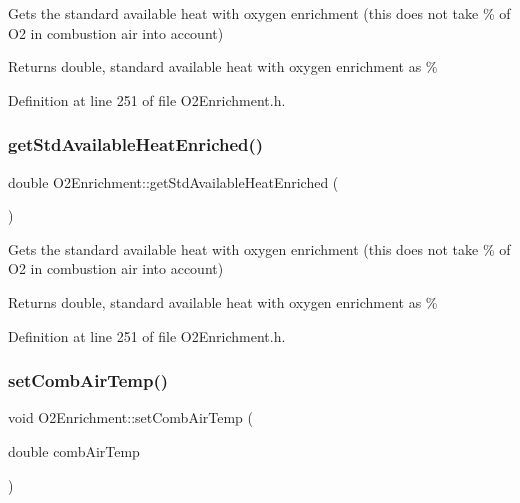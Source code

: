 Gets the standard available heat with oxygen enrichment (this does not take \% of O2 in combustion air into account) \begin{DoxyReturn}{Returns}
double, standard available heat with oxygen enrichment as \% 
\end{DoxyReturn}


Definition at line 251 of file O2\+Enrichment.\+h.

\mbox{\label{class_o2_enrichment_a24fd19f2aca20c7ba83061b832323ad6}} 
\subsubsection{\texorpdfstring{get\+Std\+Available\+Heat\+Enriched()}{getStdAvailableHeatEnriched()}\hspace{0.1cm}{\footnotesize\ttfamily [3/3]}}
{\footnotesize\ttfamily double O2\+Enrichment\+::get\+Std\+Available\+Heat\+Enriched (\begin{DoxyParamCaption}{ }\end{DoxyParamCaption})\hspace{0.3cm}{\ttfamily [inline]}}

Gets the standard available heat with oxygen enrichment (this does not take \% of O2 in combustion air into account) \begin{DoxyReturn}{Returns}
double, standard available heat with oxygen enrichment as \% 
\end{DoxyReturn}


Definition at line 251 of file O2\+Enrichment.\+h.

\mbox{\label{class_o2_enrichment_a70636d71deb4db00ddf761b0dffa3f36}} 
\subsubsection{\texorpdfstring{set\+Comb\+Air\+Temp()}{setCombAirTemp()}\hspace{0.1cm}{\footnotesize\ttfamily [1/3]}}
{\footnotesize\ttfamily void O2\+Enrichment\+::set\+Comb\+Air\+Temp (\begin{DoxyParamCaption}\item[{double}]{comb\+Air\+Temp }\end{DoxyParamCaption})\hspace{0.3cm}{\ttfamily [inline]}}

